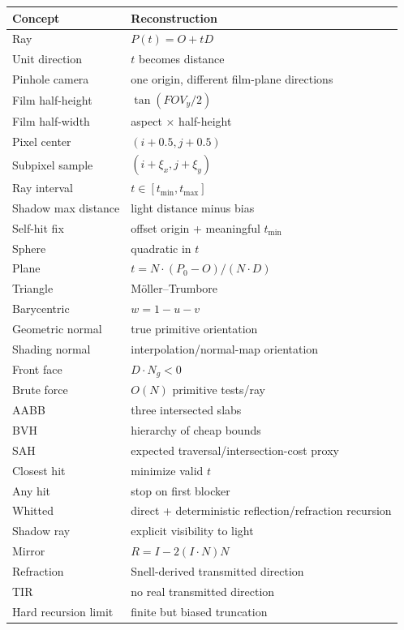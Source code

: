 {\def\LTcaptype{none} %
\begin{longtable}[]{@{}ll@{}}
\toprule\noalign{}
Concept & Reconstruction \\
\midrule\noalign{}
\endhead
\bottomrule\noalign{}
\endlastfoot
Ray & \(P(t)=O+tD\) \\
Unit direction & \(t\) becomes distance \\
Pinhole camera & one origin, different film-plane directions \\
Film half-height & \(\tan(FOV_y/2)\) \\
Film half-width & aspect × half-height \\
Pixel center & \((i+0.5,j+0.5)\) \\
Subpixel sample & \((i+\xi_x,j+\xi_y)\) \\
Ray interval & \(t\in[t_{\min},t_{\max}]\) \\
Shadow max distance & light distance minus bias \\
Self-hit fix & offset origin + meaningful \(t_{\min}\) \\
Sphere & quadratic in \(t\) \\
Plane & \(t=N\cdot(P_0-O)/(N\cdot D)\) \\
Triangle & Möller--Trumbore \\
Barycentric & \(w=1-u-v\) \\
Geometric normal & true primitive orientation \\
Shading normal & interpolation/normal-map orientation \\
Front face & \(D\cdot N_g<0\) \\
Brute force & \(O(N)\) primitive tests/ray \\
AABB & three intersected slabs \\
BVH & hierarchy of cheap bounds \\
SAH & expected traversal/intersection-cost proxy \\
Closest hit & minimize valid \(t\) \\
Any hit & stop on first blocker \\
Whitted & direct + deterministic reflection/refraction recursion \\
Shadow ray & explicit visibility to light \\
Mirror & \(R=I-2(I\cdot N)N\) \\
Refraction & Snell-derived transmitted direction \\
TIR & no real transmitted direction \\
Hard recursion limit & finite but biased truncation \\

\end{longtable}}
